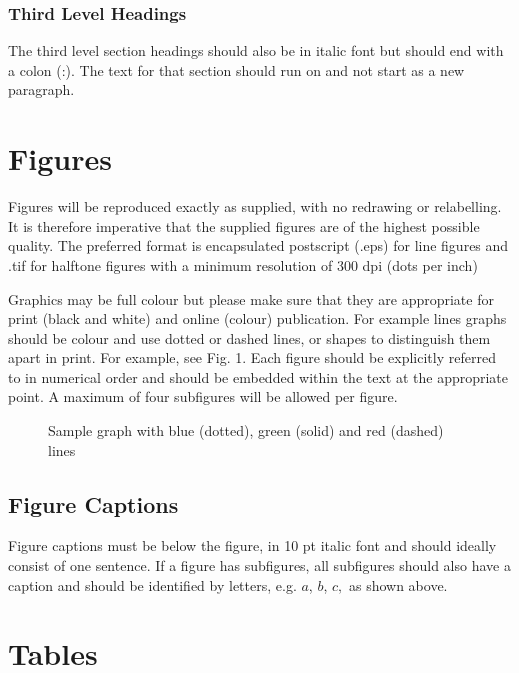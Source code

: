 \documentclass{IET}
\begin{document}
\subsubsection{Third Level Headings}
The third level section headings should also be in italic font but should
end with a colon (:). The text for that section should run on and not start
as a new paragraph.

\section{Figures}

Figures will be reproduced exactly as supplied, with no redrawing or
relabelling. It is therefore imperative that the supplied figures are of the
highest possible quality. The preferred format is encapsulated postscript
(.eps) for line figures and .tif for halftone figures with a minimum
resolution of 300 dpi (dots per inch)

Graphics may be full colour but please make sure that they are appropriate
for print (black and white) and online (colour) publication. For example
lines graphs should be colour and use dotted or dashed lines, or shapes to
distinguish them apart in print. For example, see Fig. 1. Each figure should
be explicitly referred to in numerical order and should be embedded within
the text at the appropriate point. A maximum of four subfigures will be
allowed per figure.

\begin{figure}[!h]
\caption{Sample graph with blue (dotted), green (solid) and red (dashed) lines
}
\end{figure}

\enlargethispage{20pt}

\subsection{Figure Captions}

Figure captions must be below the figure, in 10 pt italic font and should
ideally consist of one sentence. If a figure has subfigures, all subfigures
should also have a caption and should be identified by letters, e.g. $a$, $b$,
$c,$ as shown above.

\section{Tables}
\end{document}
